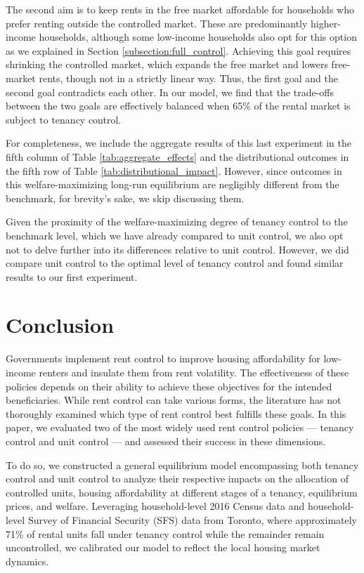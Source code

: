 \documentclass[parskip=full]{article}
\begin{document}
The second aim is to keep rents in the free market affordable for households who prefer renting outside the controlled market. These are predominantly higher-income households, although some low-income households also opt for this option as we explained in Section \ref{subsection:full_control}. Achieving this goal requires shrinking the controlled market, which expands the free market and lowers free-market rents, though not in a strictly linear way. Thus, the first goal and the second goal contradicts each other. In our model, we find that the trade-offs between the two goals are effectively balanced when 65\% of the rental market is subject to tenancy control.

For completeness, we include the aggregate results of this last experiment in the fifth column of Table \ref{tab:aggregate_effects} and the distributional outcomes in the fifth row of Table \ref{tab:distributional_impact}. However, since outcomes in this welfare-maximizing long-run equilibrium are negligibly different from the benchmark, for brevity's sake, we skip discussing them.

Given the proximity of the welfare-maximizing degree of tenancy control to the benchmark level, which we have already compared to unit control, we also opt not to delve further into its differences relative to unit control. However, we did compare unit control to the optimal level of tenancy control and found similar results to our first experiment.

\section{Conclusion}\label{sec:conclusion}

Governments implement rent control to improve housing affordability for low-income renters and insulate them from rent volatility. The effectiveness of these policies depends on their ability to achieve these objectives for the intended beneficiaries. While rent control can take various forms, the literature has not thoroughly examined which type of rent control best fulfills these goals. In this paper, we evaluated two of the most widely used rent control policies — tenancy control and unit control — and assessed their success in these dimensions.

To do so, we constructed a general equilibrium model encompassing both tenancy control and unit control to analyze their respective impacts on the allocation of controlled units, housing affordability at different stages of a tenancy, equilibrium prices, and welfare. Leveraging household-level 2016 Census data and household-level Survey of Financial Security (SFS) data from Toronto, where approximately 71\% of rental units fall under tenancy control while the remainder remain uncontrolled, we calibrated our model to reflect the local housing market dynamics.
\end{document}
